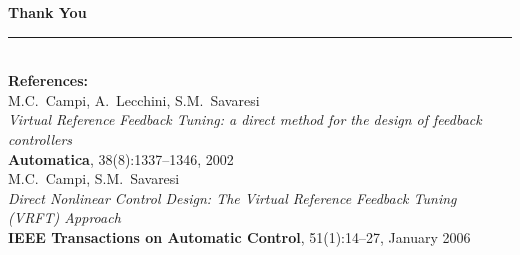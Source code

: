 \documentclass[hyperref={pdfpagemode=FullScreen},aspectratio=169]{beamer}
\begin{document}
\begin{frame}[plain]
  \begin{center}
    \vspace{1.5em}
    {\Large\color{darkgreen}\textbf{Thank You}}\\[1em]
    \rule{0.55\textwidth}{0.5pt}\\[1em]
    \textbf{References:}\\[0.4em]
    M.C.~Campi, A.~Lecchini, S.M.~Savaresi\\
    \textit{Virtual Reference Feedback Tuning: a direct method for the design of feedback controllers}\\
    \textbf{Automatica}, 38(8):1337--1346, 2002\\[1.5em]
   
    M.C.~Campi, S.M.~Savaresi\\
    \textit{Direct Nonlinear Control Design: The Virtual Reference Feedback Tuning (VRFT) Approach}\\
    \textbf{IEEE Transactions on Automatic Control}, 51(1):14--27, January 2006\\[1.5em]
 
  \end{center}
\end{frame}
\end{document}
